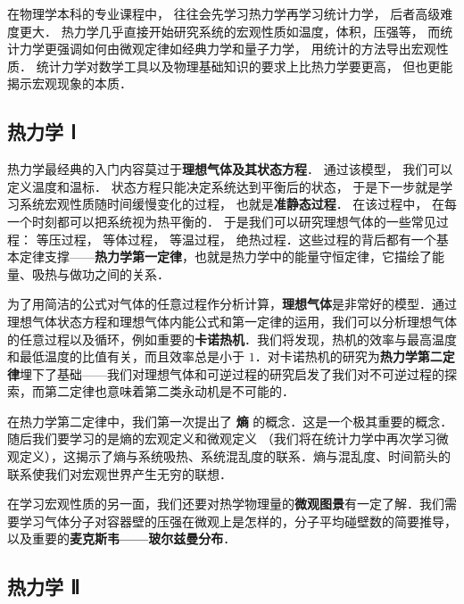 
\begin{issues}
\issueDraft
\end{issues}

在物理学本科的专业课程中， 往往会先学习热力学再学习统计力学， 后者高级难度更大． 热力学几乎直接开始研究系统的宏观性质如温度，体积，压强等， 而统计力学更强调如何由微观定律如经典力学和量子力学， 用统计的方法导出宏观性质． 统计力学对数学工具以及物理基础知识的要求上比热力学要更高， 但也更能揭示宏观现象的本质．

\subsection{热力学 Ⅰ}
热力学最经典的入门内容莫过于\textbf{理想气体及其状态方程}． 通过该模型， 我们可以定义温度和温标． 状态方程只能决定系统达到平衡后的状态， 于是下一步就是学习系统宏观性质随时间缓慢变化的过程， 也就是\textbf{准静态过程}． 在该过程中， 在每一个时刻都可以把系统视为热平衡的． 于是我们可以研究理想气体的一些常见过程： 等压过程， 等体过程， 等温过程， 绝热过程．这些过程的背后都有一个基本定律支撑——\textbf{热力学第一定律}，也就是热力学中的能量守恒定律，它描绘了能量、吸热与做功之间的关系．

为了用简洁的公式对气体的任意过程作分析计算，\textbf{理想气体}是非常好的模型．通过理想气体状态方程和理想气体内能公式和第一定律的运用，我们可以分析理想气体的任意过程以及循环，例如重要的\textbf{卡诺热机}．我们将发现，热机的效率与最高温度和最低温度的比值有关，而且效率总是小于 $1$．对卡诺热机的研究为\textbf{热力学第二定律}埋下了基础——我们对理想气体和可逆过程的研究启发了我们对不可逆过程的探索，而第二定律也意味着第二类永动机是不可能的．

在热力学第二定律中，我们第一次提出了 \textbf{熵} 的概念．这是一个极其重要的概念．随后我们要学习的是熵的宏观定义和微观定义 （我们将在统计力学中再次学习微观定义），这揭示了熵与系统吸热、系统混乱度的联系．熵与混乱度、时间箭头的联系使我们对宏观世界产生无穷的联想．

在学习宏观性质的另一面，我们还要对热学物理量的\textbf{微观图景}有一定了解．我们需要学习气体分子对容器壁的压强在微观上是怎样的，分子平均碰壁数的简要推导，以及重要的\textbf{麦克斯韦——玻尔兹曼分布}．

\subsection{热力学 Ⅱ}

